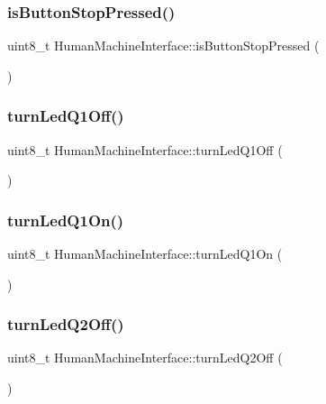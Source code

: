 \subsubsection{\texorpdfstring{is\+Button\+Stop\+Pressed()}{isButtonStopPressed()}}
{\footnotesize\ttfamily uint8\+\_\+t Human\+Machine\+Interface\+::is\+Button\+Stop\+Pressed (\begin{DoxyParamCaption}{ }\end{DoxyParamCaption})}

\hypertarget{class_human_machine_interface_a7d696c1803928a001bb98585f2ceb138}{}\label{class_human_machine_interface_a7d696c1803928a001bb98585f2ceb138} 
\subsubsection{\texorpdfstring{turn\+Led\+Q1\+Off()}{turnLedQ1Off()}}
{\footnotesize\ttfamily uint8\+\_\+t Human\+Machine\+Interface\+::turn\+Led\+Q1\+Off (\begin{DoxyParamCaption}{ }\end{DoxyParamCaption})}

\hypertarget{class_human_machine_interface_a0ba867b5493f024f53c1e00a1287aa6c}{}\label{class_human_machine_interface_a0ba867b5493f024f53c1e00a1287aa6c} 
\subsubsection{\texorpdfstring{turn\+Led\+Q1\+On()}{turnLedQ1On()}}
{\footnotesize\ttfamily uint8\+\_\+t Human\+Machine\+Interface\+::turn\+Led\+Q1\+On (\begin{DoxyParamCaption}{ }\end{DoxyParamCaption})}

\hypertarget{class_human_machine_interface_a73d76c6dd54b115fa8df9cf5f2b0d2aa}{}\label{class_human_machine_interface_a73d76c6dd54b115fa8df9cf5f2b0d2aa} 
\subsubsection{\texorpdfstring{turn\+Led\+Q2\+Off()}{turnLedQ2Off()}}
{\footnotesize\ttfamily uint8\+\_\+t Human\+Machine\+Interface\+::turn\+Led\+Q2\+Off (\begin{DoxyParamCaption}{ }\end{DoxyParamCaption})}

